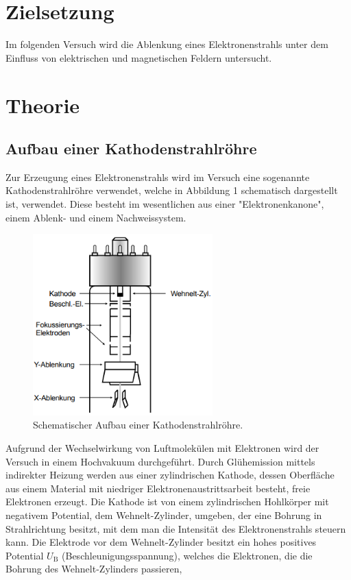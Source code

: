 \section{Zielsetzung}
\label{sec:Zielsetzung}
Im folgenden Versuch wird die Ablenkung eines Elektronenstrahls unter dem Einfluss von
elektrischen und magnetischen Feldern untersucht.

\section{Theorie}
\label{sec:Theorie}
\subsection{Aufbau einer Kathodenstrahlröhre}
Zur Erzeugung eines Elektronenstrahls wird im Versuch eine sogenannte Kathodenstrahlröhre verwendet,
welche in Abbildung 1 schematisch dargestellt ist, verwendet. Diese besteht im wesentlichen aus einer 
"Elektronenkanone", einem Ablenk- und einem Nachweissystem.
\begin{figure}[H]
  \centering
  \includegraphics[height=7cm]{schema1.png}
  \caption{Schematischer Aufbau einer Kathodenstrahlröhre. \cite[S.2]{kent}}
\end{figure}
Aufgrund der Wechselwirkung von Luftmolekülen mit Elektronen wird der Versuch in einem Hochvakuum durchgeführt.
Durch Glühemission mittels indirekter Heizung werden aus einer zylindrischen Kathode, dessen Oberfläche aus einem Material
mit niedriger Elektronenaustrittsarbeit besteht, freie Elektronen erzeugt. Die Kathode ist
von einem zylindrischen Hohlkörper mit negativem Potential, dem Wehnelt-Zylinder, umgeben, 
der eine Bohrung in Strahlrichtung besitzt, mit dem man die Intensität des Elektronenstrahls
steuern kann. Die Elektrode vor dem Wehnelt-Zylinder besitzt ein hohes positives Potential $U_\text{B}$ 
(Beschleunigungsspannung), welches die Elektronen, die die Bohrung des Wehnelt-Zylinders passieren, 
